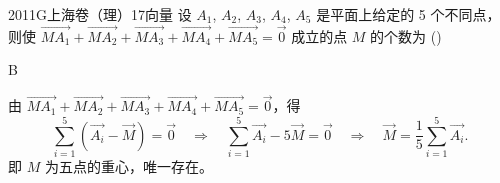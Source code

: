 
\begin{problem}{2011}{G}{上海卷（理）}{17}{向量}
设 $ A_1 $, $ A_2 $, $ A_3 $, $ A_4 $, $ A_5 $ 是平面上给定的 5 个不同点，则使 $ \overrightarrow{MA_1} + \overrightarrow{MA_2} + \overrightarrow{MA_3} + \overrightarrow{MA_4} + \overrightarrow{MA_5} = \vec{0} $ 成立的点 $ M $ 的个数为 (\hspace{1cm})
\begin{choices}
\end{choices}
\end{problem}

\begin{answer}
B
\end{answer}

\begin{solutions}
由 $ \overrightarrow{MA_1} + \overrightarrow{MA_2} + \overrightarrow{MA_3} + \overrightarrow{MA_4} + \overrightarrow{MA_5} = \vec{0} $，得  
$$
\sum_{i=1}^{5} (\vec{A_i} - \vec{M}) = \vec{0} \quad \Rightarrow \quad \sum_{i=1}^{5} \vec{A_i} - 5\vec{M} = \vec{0} \quad \Rightarrow \quad \vec{M} = \frac{1}{5} \sum_{i=1}^{5} \vec{A_i}.
$$  
即 $ M $ 为五点的重心，唯一存在。  
\end{solutions}